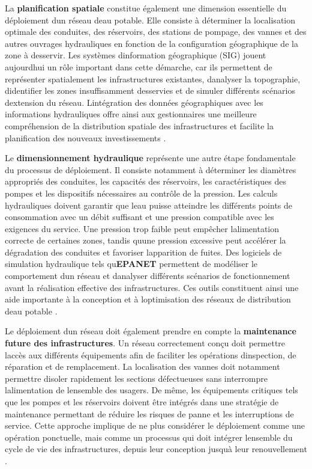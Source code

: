 \documentclass[12pt,a4paper,oneside]{report}
\begin{document}
La \textbf{planification spatiale} constitue également une dimension
essentielle du déploiement d\textquotesingle un réseau
d\textquotesingle eau potable. Elle consiste à déterminer la
localisation optimale des conduites, des réservoirs, des stations de
pompage, des vannes et des autres ouvrages hydrauliques en fonction de
la configuration géographique de la zone à desservir. Les systèmes
d\textquotesingle information géographique (SIG) jouent
aujourd\textquotesingle hui un rôle important dans cette démarche, car
ils permettent de représenter spatialement les infrastructures
existantes, d\textquotesingle analyser la topographie,
d\textquotesingle identifier les zones insuffisamment desservies et de
simuler différents scénarios d\textquotesingle extension du réseau.
L\textquotesingle intégration des données géographiques avec les
informations hydrauliques offre ainsi aux gestionnaires une meilleure
compréhension de la distribution spatiale des infrastructures et
facilite la planification des nouveaux investissements \cite{ref40}.

Le \textbf{dimensionnement hydraulique} représente une autre étape
fondamentale du processus de déploiement. Il consiste notamment à
déterminer les diamètres appropriés des conduites, les capacités des
réservoirs, les caractéristiques des pompes et les dispositifs
nécessaires au contrôle de la pression. Les calculs hydrauliques doivent
garantir que l\textquotesingle eau puisse atteindre les différents
points de consommation avec un débit suffisant et une pression
compatible avec les exigences du service. Une pression trop faible peut
empêcher l\textquotesingle alimentation correcte de certaines zones,
tandis qu\textquotesingle une pression excessive peut accélérer la
dégradation des conduites et favoriser l\textquotesingle apparition de
fuites. Des logiciels de simulation hydraulique tels
qu\textquotesingle{}\textbf{EPANET} permettent de modéliser le
comportement d\textquotesingle un réseau et d\textquotesingle analyser
différents scénarios de fonctionnement avant la réalisation effective
des infrastructures. Ces outils constituent ainsi une aide importante à
la conception et à l\textquotesingle optimisation des réseaux de
distribution d\textquotesingle eau potable \cite{ref34}.

Le déploiement d\textquotesingle un réseau doit également prendre en
compte la \textbf{maintenance future des infrastructures}. Un réseau
correctement conçu doit permettre l\textquotesingle accès aux différents
équipements afin de faciliter les opérations
d\textquotesingle inspection, de réparation et de remplacement. La
localisation des vannes doit notamment permettre
d\textquotesingle isoler rapidement les sections défectueuses sans
interrompre l\textquotesingle alimentation de l\textquotesingle ensemble
des usagers. De même, les équipements critiques tels que les pompes et
les réservoirs doivent être intégrés dans une stratégie de maintenance
permettant de réduire les risques de panne et les interruptions de
service. Cette approche implique de ne plus considérer le déploiement
comme une opération ponctuelle, mais comme un processus qui doit
intégrer l\textquotesingle ensemble du cycle de vie des infrastructures,
depuis leur conception jusqu\textquotesingle à leur renouvellement
\cite{ref42}.
\end{document}
